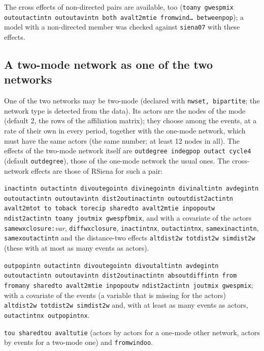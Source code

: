The cross effects of non-directed pairs are available, too (\texttt{toany gwespmix outoutactintn outoutavintn both avalt2mtie fromwind\ldots{} betweenpop}); a model with a non-directed member was checked against \texttt{siena07} with these effects.

\subsection{A two-mode network as one of the two networks}\label{sec:mn-twomode}
One of the two networks may be two-mode (declared with \texttt{nwset, bipartite}; the network type is detected from the data). Its actors are the nodes of the mode  (default 2, the rows of the affiliation matrix); they choose among the events, at a rate of their own in every period, together with the one-mode network, which must have the same actors (the same number; at least 12 nodes in all). The effects of the two-mode network itself are \texttt{outdegree indegpop outact cycle4} (default \texttt{outdegree}), those of the one-mode network the usual ones. The cross-network effects are those of RSiena for such a pair:
\begin{description}[leftmargin=0pt,labelindent=0pt]
\item[Two-mode network depending on the one-mode network] \texttt{inactintn outactintn divoutegointn divinegointn divinaltintn avdegintn outoutactintn outoutavintn dist2outinactintn outoutdist2actintn avalt2mtot to toback torecip sharedto avalt2mtie inpopoutw ndist2actintn toany joutmix gwespfbmix}, and with a covariate of the actors \texttt{samewxclosure:}\emph{var}, \texttt{diffwxclosure}, \texttt{inactintnx}, \texttt{outactintnx}, \texttt{samexinactintn}, \texttt{samexoutactintn} and the distance-two effects \texttt{altdist2w totdist2w simdist2w} (these with at most as many events as actors).
\item[One-mode network depending on the two-mode network] \texttt{outpopintn outactintn divoutegointn divoutaltintn avdegintn outoutactintn outoutavintn dist2outinactintn absoutdiffintn from fromany sharedto avalt2mtie inpopoutw ndist2actintn joutmix gwespmix}; with a covariate of the events (a variable that is missing for the actors) \texttt{altdist2w totdist2w simdist2w} and, with at least as many events as actors, \texttt{outactintnx outpopintnx}.
\item[With a dyadic covariate] \texttt{tou sharedtou avaltutie} (actors by actors for a one-mode other network, actors by events for a two-mode one) and \texttt{fromwindoo}.
\end{description}
